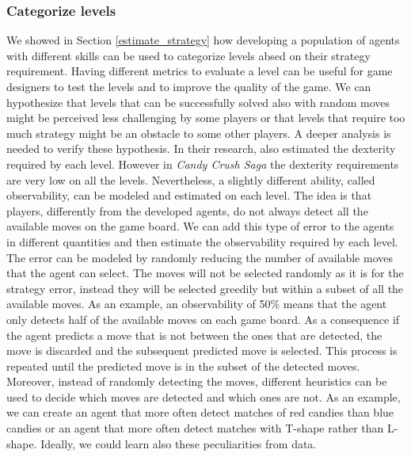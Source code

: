 \subsubsection*{Categorize levels}
We showed in Section \ref{estimate_strategy} how developing a population of agents with different skills can be used to categorize levels absed on their strategy requirement.
Having different metrics to evaluate a level can be useful for game designers to test the levels and to improve the quality of the game. We can hypothesize that levels that can be successfully solved also with random moves might be perceived less challenging by some players or that levels that require too much strategy might be an obstacle to some other players. A deeper analysis is needed to verify these hypothesis. 
In their research, \textcite{isaksen_simulating_2017} also estimated the dexterity required by each level. However in \textit{Candy Crush Saga} the dexterity requirements are very low on all the levels. Nevertheless, a slightly different ability, called observability, can be modeled and estimated on each level. The idea is that players, differently from the developed agents, do not always detect all the available moves on the game board. We can add this type of error to the agents in different quantities and then estimate the observability required by each level. The error can be modeled by randomly reducing the number of available moves that the agent can select. The moves will not be selected randomly as it is for the strategy error, instead they will be selected greedily but within a subset of all the available moves. As an example, an observability of 50\% means that the agent only detects half of the available moves on each game board. As a consequence if the agent predicts a move that is not between the ones that are detected, the move is discarded and the subsequent predicted move is selected. This process is repeated until the predicted move is in the subset of the detected moves. Moreover, instead of randomly detecting the moves, different heuristics can be used to decide which moves are detected and which ones are not. As an example, we can create an agent that more often detect matches of red candies than blue candies or an agent that more often detect matches with T-shape rather than L-shape. Ideally, we could learn also these peculiarities from data.

